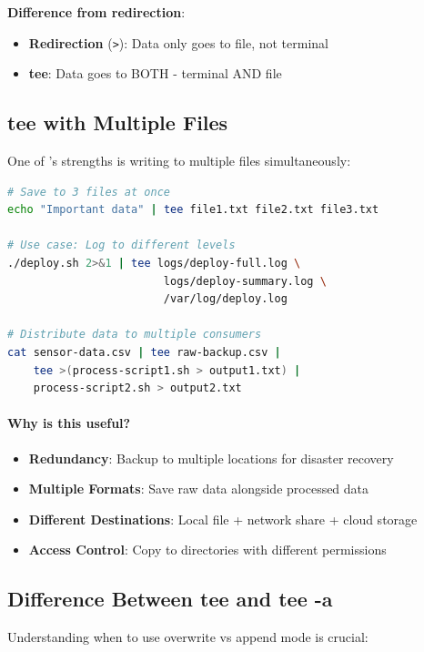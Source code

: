 \textbf{Difference from redirection}:
\begin{itemize}
	\item \textbf{Redirection} (\texttt{>}): Data only goes to file, not terminal
	\item \textbf{tee}: Data goes to BOTH - terminal AND file
\end{itemize}

\subsection{tee with Multiple Files}

One of 's strengths is writing to multiple files simultaneously:

\begin{lstlisting}[language=bash, caption={tee with multiple files}]
# Save to 3 files at once
echo "Important data" | tee file1.txt file2.txt file3.txt

# Use case: Log to different levels
./deploy.sh 2>&1 | tee logs/deploy-full.log \
                        logs/deploy-summary.log \
                        /var/log/deploy.log

# Distribute data to multiple consumers
cat sensor-data.csv | tee raw-backup.csv |
    tee >(process-script1.sh > output1.txt) |
    process-script2.sh > output2.txt
\end{lstlisting}

\paragraph{Why is this useful?}

\begin{itemize}
	\item \textbf{Redundancy}: Backup to multiple locations for disaster recovery
	\item \textbf{Multiple Formats}: Save raw data alongside processed data
	\item \textbf{Different Destinations}: Local file + network share + cloud storage
	\item \textbf{Access Control}: Copy to directories with different permissions
\end{itemize}

\subsection{Difference Between tee and tee -a}

Understanding when to use overwrite vs append mode is crucial:

